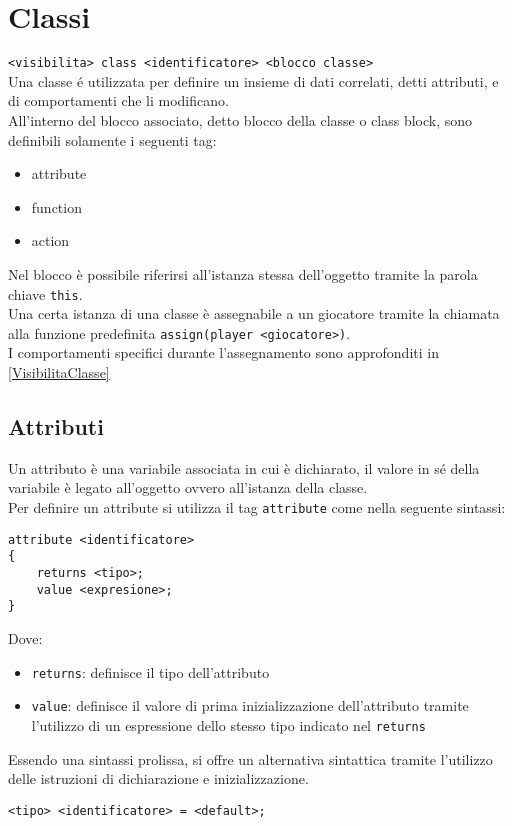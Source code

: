 \section{Classi}
\lstinline|<visibilita> class <identificatore> <blocco classe>| \\
Una classe é utilizzata per definire un insieme di dati correlati, detti attributi, e di 
comportamenti che li modificano. \\
All'interno del blocco associato, detto blocco della classe o class block, sono definibili
solamente i seguenti tag:
\begin{itemize}
    \item attribute
    \item function
    \item action
\end{itemize}
Nel blocco è possibile riferirsi all'istanza stessa dell'oggetto tramite la parola chiave \lstinline|this|. \\
Una certa istanza di una classe è assegnabile a un giocatore tramite la chiamata alla funzione predefinita \lstinline|assign(player <giocatore>)|. \\
I comportamenti specifici durante l'assegnamento sono approfonditi in \ref*{VisibilitaClasse}

\subsection{Attributi}
Un attributo è una variabile associata in cui è dichiarato, il valore in sé della 
variabile è legato all'oggetto ovvero all'istanza della classe. \\
Per definire un attribute si utilizza il tag \lstinline|attribute| come nella seguente sintassi:
\begin{lstlisting}
attribute <identificatore>
{
    returns <tipo>;     
    value <expresione>;
}
\end{lstlisting}
Dove:
\begin{itemize}
    \item \lstinline|returns|: definisce il tipo dell'attributo
    \item \lstinline|value|: definisce il valore di prima inizializzazione dell'attributo tramite 
    l'utilizzo di un espressione dello stesso tipo indicato nel \lstinline|returns|
\end{itemize}
Essendo una sintassi prolissa, si offre un alternativa sintattica tramite l'utilizzo
delle istruzioni di dichiarazione e inizializzazione.
\begin{lstlisting}
<tipo> <identificatore> = <default>; 
\end{lstlisting}

